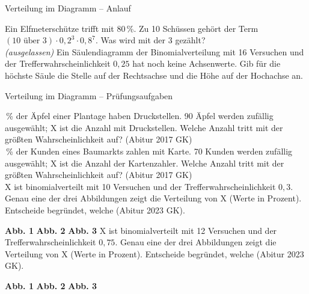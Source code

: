 \begin{aufgabe}{Verteilung im Diagramm – Anlauf}
\begin{teile}
\teil Ein Elfmeterschütze trifft mit 80\,\%. Zu 10 Schüssen gehört der Term $(10 \text{ über } 3) \cdot 0{,}2^3 \cdot 0{,}8^7$. Was wird mit der 3 gezählt?  \\ 
% 
\teil \textit{(ausgelassen)}
\teil Ein Säulendiagramm der Binomialverteilung mit 16 Versuchen und der Trefferwahrscheinlichkeit $0{,}25$ hat noch keine Achsenwerte. Gib für die höchste Säule die Stelle auf der Rechtsachse und die Höhe auf der Hochachse an.
\end{teile}
\end{aufgabe}

\begin{aufgabe}{Verteilung im Diagramm – Prüfungsaufgaben}
\begin{teile}
\,\% der Äpfel einer Plantage haben Druckstellen. 90 Äpfel werden zufällig ausgewählt; X ist die Anzahl mit Druckstellen. Welche Anzahl tritt mit der größten Wahrscheinlichkeit auf? \hfill (Abitur 2017 GK) \\ \leerfeld
{}\,\% der Kunden eines Baumarkts zahlen mit Karte. 70 Kunden werden zufällig ausgewählt; X ist die Anzahl der Kartenzahler. Welche Anzahl tritt mit der größten Wahrscheinlichkeit auf? \hfill (Abitur 2017 GK) \\ \leerfeld
\teil X ist binomialverteilt mit 10 Versuchen und der Trefferwahrscheinlichkeit $0{,}3$. Genau eine der drei Abbildungen zeigt die Verteilung von X (Werte in Prozent). Entscheide begründet, welche \hfill (Abitur 2023 GK).

\textbf{Abb. 1}  \quad \textbf{Abb. 2}  \quad \textbf{Abb. 3} 
\teil X ist binomialverteilt mit 12 Versuchen und der Trefferwahrscheinlichkeit $0{,}75$. Genau eine der drei Abbildungen zeigt die Verteilung von X (Werte in Prozent). Entscheide begründet, welche \hfill (Abitur 2023 GK).

\textbf{Abb. 1}  \quad \textbf{Abb. 2}  \quad \textbf{Abb. 3} 
\end{teile}
\end{aufgabe}

